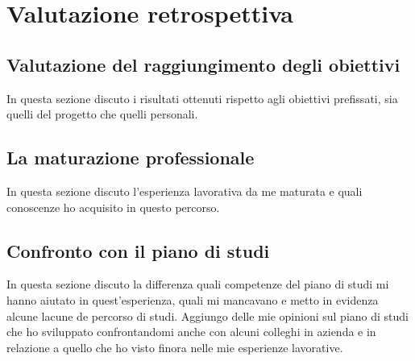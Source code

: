 \chapter{Valutazione retrospettiva}
\label{chap:analisi-requisiti}

\section{Valutazione del raggiungimento degli obiettivi}
\noindent
In questa sezione discuto i risultati ottenuti rispetto agli obiettivi prefissati, sia quelli del progetto che quelli personali.

\section{La maturazione professionale}
\noindent
In questa sezione discuto l'esperienza lavorativa da me maturata e quali conoscenze ho acquisito in questo percorso.

\section{Confronto con il piano di studi}
\noindent
In questa sezione discuto la differenza quali competenze del piano di studi mi hanno aiutato in quest'esperienza, quali mi mancavano e metto in evidenza alcune lacune de percorso di studi.
Aggiungo delle mie opinioni sul piano di studi che ho sviluppato confrontandomi anche con alcuni colleghi in azienda e in relazione a quello che ho visto finora nelle mie esperienze lavorative.

\newpage
